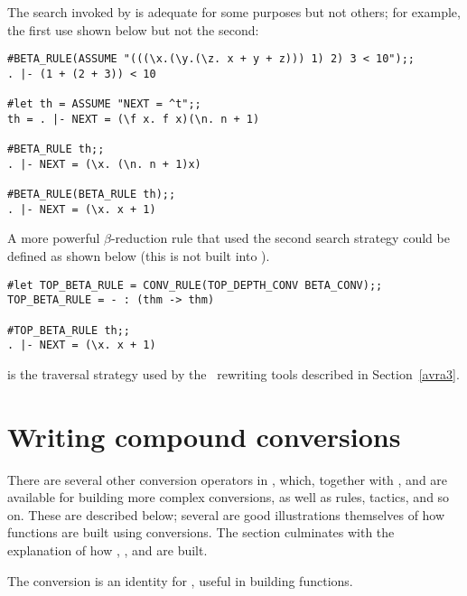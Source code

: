 \noindent The search invoked by 
is adequate for some purposes but not others; for example,
the first use shown below but not the second:

\begin{session}\begin{verbatim}
#BETA_RULE(ASSUME "(((\x.(\y.(\z. x + y + z))) 1) 2) 3 < 10");;
. |- (1 + (2 + 3)) < 10

#let th = ASSUME "NEXT = ^t";;
th = . |- NEXT = (\f x. f x)(\n. n + 1)

#BETA_RULE th;;
. |- NEXT = (\x. (\n. n + 1)x)

#BETA_RULE(BETA_RULE th);;
. |- NEXT = (\x. x + 1)
\end{verbatim}\end{session}

\noindent A more powerful
$\beta$-reduction rule
that used the second  search strategy could be defined as shown below
(this is not built into \HOL).

\begin{session}\begin{verbatim}
#let TOP_BETA_RULE = CONV_RULE(TOP_DEPTH_CONV BETA_CONV);;
TOP_BETA_RULE = - : (thm -> thm)

#TOP_BETA_RULE th;;
. |- NEXT = (\x. x + 1)
\end{verbatim}\end{session}

 is the traversal
strategy used by the \HOL\ rewriting tools described in Section~\ref{avra3}.

\section{Writing compound conversions}
\label{avra2}

There are several other conversion operators in \HOL, which,
together with ,  and  are available
for building more complex conversions, as well as rules, tactics, and so on.
These are described below; several are good illustrations themselves
of how functions are built using conversions. The section culminates
with the explanation of how , , and 
 are built.

The conversion  is an identity for 
, useful
in building functions.

